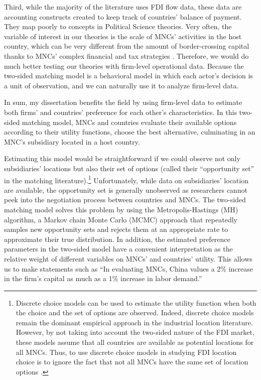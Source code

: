 Third, while the majority of the literature uses FDI flow data, these data are
accounting constructs created to keep track of countries' balance of payment.
They map poorly to concepts in Political Science theories. Very often, the
variable of interest in our theories is the scale of MNCs' activities in the
host country, which can be very different from the amount of border-crossing
capital thanks to MNCs' complex financial and tax strategies \citep{Kerner2014}.
Therefore, we would do much better testing our theories with firm-level
operational data. Because the two-sided matching model is a behavioral model in
which each actor's decision is a unit of observation, and we can naturally use
it to analyze firm-level data.

In sum, my dissertation benefits the field by using firm-level data to estimate
both firms' and countries' preference for each other's characteristics. In this
two-sided matching model, MNCs and countries evaluate their available options
according to their utility functions, choose the best alternative, culminating
in an MNC's subsidiary located in a host country.

Estimating this model would be straightforward if we could observe not only
subsidiaries' locations but also their set of options (called their
``opportunity set'' in the matching literature).\footnote{Discrete choice models
  can be used to estimate the utility function when both the choice and the set
  of options are observed. Indeed, discrete choice models remain the dominant
  empirical approach in the industrial location literature. However, by not
  taking into account the two-sided nature of the FDI market, these models
  assume that all countries are available as potential locations for all MNCs.
  Thus, to use discrete choice models in studying FDI location choice is to
  ignore the fact that not all MNCs have the same set of location options
  \citep{Arauzo-Carod2010}.} Unfortunately, while data on subsidiaries' location
are available, the opportunity set is generally unobserved as researchers cannot
peek into the negotiation process between countries and MNCs. The two-sided
matching model solves this problem by using the Metropolis-Hastings (MH)
algorithm, a Markov chain Monte Carlo (MCMC) approach that repeatedly samples
new opportunity sets and rejects them at an appropriate rate to approximate
their true distribution. In addition, the estimated preference parameters in the
two-sided model have a convenient interpretation as the relative weight of
different variables on MNCs' and countries' utility. This allows us to make
statements such as ``In evaluating MNCs, China values a 2\% increase in the
firm's capital as much as a 1\% increase in labor demand.''

